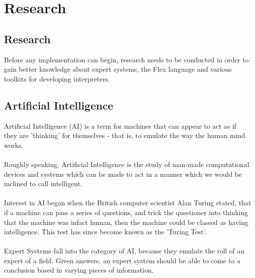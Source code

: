 \documentclass[12pt]{report}
\begin{document}
\chapter{Research}
\section[Research]{Research}\label{sec:intro_to_research}
Before any implementation can begin, research needs to be conducted in order to gain better knowledge about expert systems, the Flex language and various toolkits for developing interpreters.

\section{Artificial Intelligence}\label{sec:AI}
Artificial Intelligence (AI) is a term for machines that can appear to act as if they are 'thinking' for themselves - that is, to emulate the way the human mind works.\\
\\
Roughly speaking, Artificial Intelligence is the study of man-made computational devices and systems which can be made to act in a manner which we would be inclined to call intelligent. \citep{whatisai}
\\
\\
Interest in AI began when the British computer scientist Alan Turing stated, that if a machine can pass a series of questions, and trick the questioner into thinking that the machine was infact human, then the machine could be classed as having intelligence.  This test has since become known as the 'Turing Test'.\\
\\
Expert Systems fall into the category of AI, because they emulate the roll of an expert of a field.  Given answers, an expert system should be able to come to a conclusion based in varying pieces of information.
\end{document}
